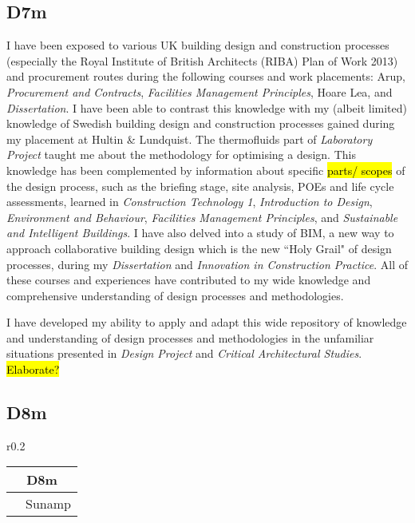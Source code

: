 \subsection*{D7m}

I have been exposed to various UK building design and construction processes (especially the Royal Institute of British Architects (RIBA) Plan of Work 2013) and procurement routes during the following courses and work placements:
Arup,
\textit{Procurement and Contracts},
\textit{Facilities Management Principles},
Hoare Lea,
and
\textit{Dissertation}.
I have been able to contrast this knowledge with my (albeit limited) knowledge of Swedish building design and construction processes gained during my placement at Hultin \& Lundquist.
The thermofluids part of \textit{Laboratory Project} taught me about the methodology for optimising a design.
This knowledge has been complemented by information about specific \hl{parts/ scopes} of the design process, such as the briefing stage, site analysis, POEs and life cycle assessments, learned in
\textit{Construction Technology 1},
\textit{Introduction to Design},
\textit{Environment and Behaviour},
\textit{Facilities Management Principles},
and \textit{Sustainable and Intelligent Buildings}.
I have also delved into a study of BIM, a new way to approach collaborative building design which is the new ``Holy Grail" of design processes, during my \textit{Dissertation} and \textit{Innovation in Construction Practice}.
All of these courses and experiences have contributed to my wide knowledge and comprehensive understanding of design processes and methodologies.

I have developed my ability to apply and adapt this wide repository of knowledge and understanding of design processes and methodologies in the unfamiliar situations presented in \textit{Design Project} and \textit{Critical Architectural Studies}.
\hl{Elaborate?}


\subsection*{D8m}

\begin{wraptable}{r}{0.2\textwidth}
	\begin{tabular}{|ll|}
		\hline
		\multicolumn{2}{|c|}{\cellcolor[HTML]{F8A102}\textbf{D8m}} \\ \hline
		\PRJ & Sunamp \\ \hline
	\end{tabular}
\end{wraptable}

